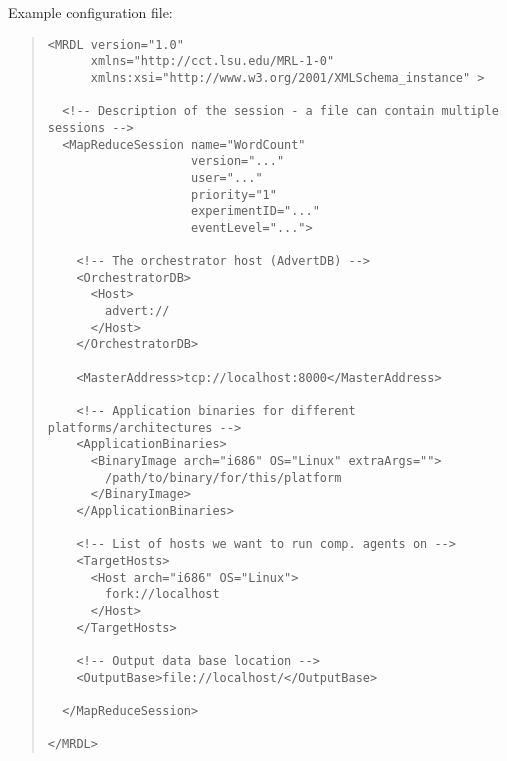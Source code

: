 \documentclass{article}
\begin{document}
Example configuration file:
\begin{quote}
\begin{verbatim}
<MRDL version="1.0"
      xmlns="http://cct.lsu.edu/MRL-1-0"
      xmlns:xsi="http://www.w3.org/2001/XMLSchema_instance" >

  <!-- Description of the session - a file can contain multiple sessions -->
  <MapReduceSession name="WordCount"
                    version="..."
                    user="..."
                    priority="1"
                    experimentID="..."
                    eventLevel="...">

    <!-- The orchestrator host (AdvertDB) -->
    <OrchestratorDB>
      <Host>
        advert://
      </Host>
    </OrchestratorDB>

    <MasterAddress>tcp://localhost:8000</MasterAddress>

    <!-- Application binaries for different platforms/architectures -->
    <ApplicationBinaries>
      <BinaryImage arch="i686" OS="Linux" extraArgs="">
        /path/to/binary/for/this/platform
      </BinaryImage>
    </ApplicationBinaries>

    <!-- List of hosts we want to run comp. agents on -->
    <TargetHosts>
      <Host arch="i686" OS="Linux">
        fork://localhost
      </Host>
    </TargetHosts>

    <!-- Output data base location -->
    <OutputBase>file://localhost/</OutputBase>

  </MapReduceSession>

</MRDL>
\end{verbatim}
\end{quote}
\end{document}
